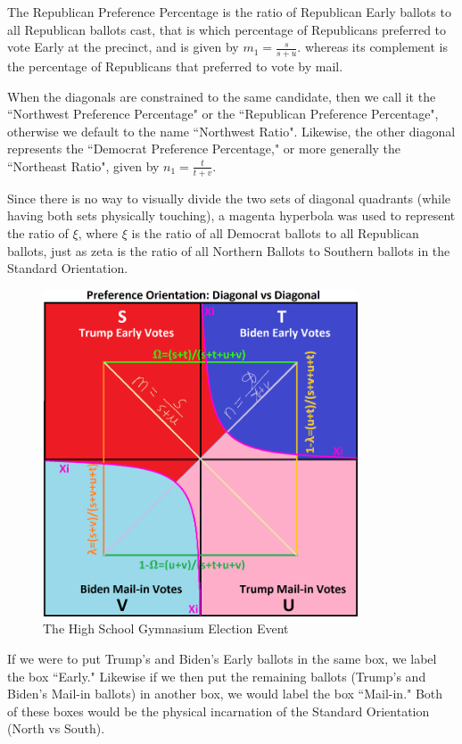 The Republican Preference Percentage is the ratio of Republican Early ballots to all Republican ballots cast, that is which percentage of Republicans preferred to vote Early at the precinct, and is given by $m_{1}=\frac{s}{s+u}$. whereas its complement is the percentage of Republicans that preferred to vote by mail.

When the diagonals are constrained to the same candidate, then we call it the ``Northwest Preference Percentage" or the ``Republican Preference Percentage", otherwise we default to the name ``Northwest Ratio". Likewise, the other diagonal represents the ``Democrat Preference Percentage," or more generally the ``Northeast Ratio", given by $n_{1}=\frac{t}{t+v}$.

Since there is no way to visually divide the two sets of diagonal quadrants (while having both sets physically touching), a magenta hyperbola was used to represent the ratio of $\xi$, where $\xi$ is the ratio of all Democrat ballots to all Republican ballots, just as zeta is the ratio of all Northern Ballots to Southern ballots in the Standard Orientation.
\begin{figure}[bp!]
\begin{center}
\caption{The High School Gymnasium Election Event}
\includegraphics[width=265pt]{Diagonal vs Diagonal.png}
\end{center}
\end{figure}
\newpage
If we were to put Trump's and Biden's Early ballots in the same box, we label the box ``Early." Likewise if we then put the remaining ballots (Trump's and Biden's Mail-in ballots) in another box, we would label the box ``Mail-in." Both of these boxes would be the physical incarnation of the Standard Orientation (North vs South).

